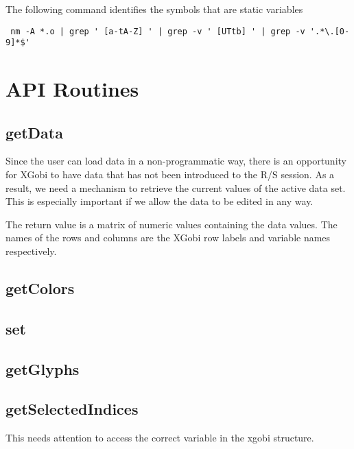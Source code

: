 The following command identifies
the symbols that are static variables
\begin{verbatim}
 nm -A *.o | grep ' [a-tA-Z] ' | grep -v ' [UTtb] ' | grep -v '.*\.[0-9]*$'
\end{verbatim}




\section{API Routines}

\subsection{getData}
Since the user can load data in a non-programmatic way, there is an
opportunity for XGobi to have data that has not been introduced to the
R/S session.  As a result, we need a mechanism to retrieve the current
values of the active data set.  This is especially important if we
allow the data to be edited in any way.

The return value is a matrix of numeric values containing the data
values.  The names of the rows and columns are the XGobi row labels
and variable names respectively.


\subsection{getColors}


\subsection{set}

\subsection{getGlyphs}


\subsection{getSelectedIndices}
This needs attention to access the correct
variable in the xgobi structure.
